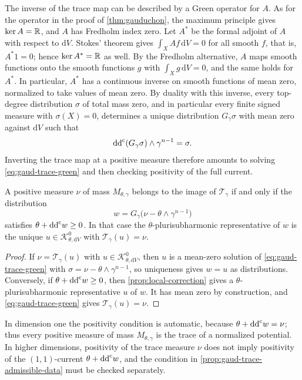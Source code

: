 The inverse of the trace map can be described by a Green operator for $A$. As for the operator in the proof of \cref{thm:gauduchon}, the maximum principle gives $\ker A=\mathbb R$, and $A$ has Fredholm index zero. Let $A^*$ be the formal adjoint of $A$ with respect to $\mathrm{d}V$. Stokes' theorem gives $\int_XAf\,\mathrm{d}V=0$ for all smooth $f$, that is, $A^*1=0$; hence $\ker A^*=\mathbb R$ as well. By the Fredholm alternative, $A$ maps smooth functions onto the smooth functions $g$ with $\int_Xg\,\mathrm{d}V=0$, and the same holds for $A^*$. In particular, $A^*$ has a continuous inverse on smooth functions of mean zero, normalized to take values of mean zero. By duality with this inverse, every top-degree distribution $\sigma$ of total mass zero, and in particular every finite signed measure with $\sigma(X)=0$, determines a unique distribution $G_\gamma\sigma$ with mean zero against $\mathrm{d}V$ such that
\begin{equation}\label{eq:gaud-trace-green}
 \mathrm{dd}^{\mathrm{c}}(G_\gamma\sigma)\wedge\gamma^{n-1}=\sigma.
\end{equation}
Inverting the trace map at a positive measure therefore amounts to solving \eqref{eq:gaud-trace-green} and then checking positivity of the full current.

\begin{proposition}\label{prop:gaud-trace-admissible-data}
A positive measure $\nu$ of mass $M_{\theta,\gamma}$ belongs to the image of $\mathcal T_\gamma$ if and only if the distribution
\[
 w=G_\gamma\bigl(\nu-\theta\wedge\gamma^{n-1}\bigr)
\]
satisfies $\theta+\mathrm{dd}^{\mathrm{c}} w\geq0$. In that case the $\theta$-plurisubharmonic representative of $w$ is the unique $u\in\mathcal K^0_{\theta,\mathrm{d}V}$ with $\mathcal T_\gamma(u)=\nu$.
\end{proposition}
\begin{proof}
If $\nu=\mathcal T_\gamma(u)$ with $u\in\mathcal K^0_{\theta,\mathrm{d}V}$, then $u$ is a mean-zero solution of \eqref{eq:gaud-trace-green} with $\sigma=\nu-\theta\wedge\gamma^{n-1}$, so uniqueness gives $w=u$ as distributions. Conversely, if $\theta+\mathrm{dd}^{\mathrm{c}} w\geq0$, then \cref{prop:local-correction} gives a $\theta$-plurisubharmonic representative $u$ of $w$. It has mean zero by construction, and \eqref{eq:gaud-trace-green} gives $\mathcal T_\gamma(u)=\nu$.
\end{proof}

In dimension one the positivity condition is automatic, because $\theta+\mathrm{dd}^{\mathrm{c}} w=\nu$; thus every positive measure of mass $M_{\theta,\gamma}$ is the trace of a normalized potential. In higher dimensions, positivity of the trace measure $\nu$ does not imply positivity of the $(1,1)$-current $\theta+\mathrm{dd}^{\mathrm{c}} w$, and the condition in \cref{prop:gaud-trace-admissible-data} must be checked separately.


